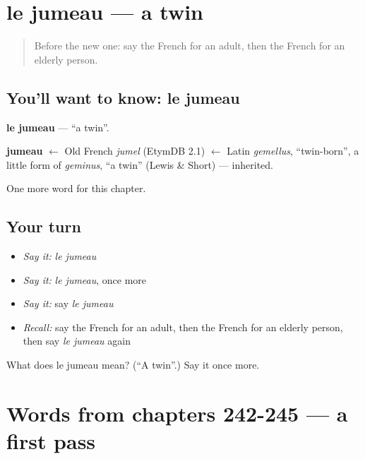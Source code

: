 \section[le jumeau]{le jumeau — a twin}

\label{lesson:FR-C250-jumeau}



\begin{quote}
Before the new one: say the French for an adult, then the French for an elderly person.
\end{quote}

\subsection*{You'll want to know: le jumeau}
\textbf{le jumeau} — \textquotedblleft{}a twin\textquotedblright{}.

\begin{cousinweb}
\textbf{jumeau} $\leftarrow$ Old French \emph{jumel} (EtymDB 2.1) $\leftarrow$ Latin \emph{gemellus}, \textquotedblleft{}twin-born\textquotedblright{}, a little form of \emph{geminus}, \textquotedblleft{}a twin\textquotedblright{} (Lewis \& Short) — inherited.
\end{cousinweb}

\begin{grammarlens}[title={What you've built}]
One more word for this chapter.
\end{grammarlens}

\subsection*{Your turn}
\begin{itemize}
\raggedright
  \item \emph{Say it:} \emph{le jumeau}
  \item \emph{Say it:} \emph{le jumeau}, once more
  \item \emph{Say it:} say \emph{le jumeau}
  \item \emph{Recall:} say the French for an adult, then the French for an elderly person, then say \emph{le jumeau} again
\end{itemize}

\begin{tcolorbox}[breakable,colback=teal!4,colframe=teal!35!black,title={Before you move on}]
What does le jumeau mean? (\textquotedblleft{}A twin\textquotedblright{}.) Say it once more.
\end{tcolorbox}
\section[(dialogue)]{Words from chapters 242-245 — a first pass}

